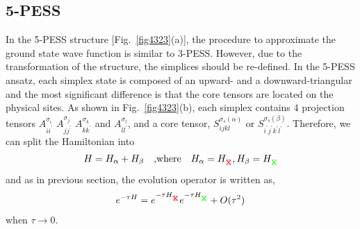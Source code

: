 \subsection{5-PESS}
\label{5pess}
In the 5-PESS structure [Fig.~\ref{fig4323}(a)], the procedure to approximate the ground state wave function is similar to 3-PESS. However, due to the transformation of the structure, the simplices should be re-defined. In the 5-PESS ansatz, each simplex state is composed of an upward- and a downward-triangular and the most significant difference is that the core tensors are located on the physical sites. As shown in Fig.~\ref{fig4323}(b), each simplex contains 4 projection tensors $A^{\sigma_i}_{ii^{\prime}}$ $A^{\sigma_j}_{jj^{\prime}}$ $A^{\sigma_k}_{kk^{\prime}}$ and $A^{\sigma_l}_{ll^{\prime}}$, and a core tensor, $S^{\sigma_s (\alpha)}_{ijkl}$ or $S^{\sigma_s (\beta)}_{i^{\prime}j^{\prime}k^{\prime}l^{\prime}}$. Therefore, we can split the Hamiltonian into 
\begin{align}
	H = H_{\alpha} + H_{\beta} \quad \text{,where} \quad H_{\alpha} = H_{\rjoinr}, H_{\beta} = H_{\rjoing}
\end{align}
and as in previous section, the evolution operator is written as, 
\begin{align}
	e^{-\tau H} = e^{-\tau H_{\rjoinr}} e^{-\tau H_{\rjoing}} + O(\tau^2)
\end{align}
when $\tau \rightarrow 0$.

